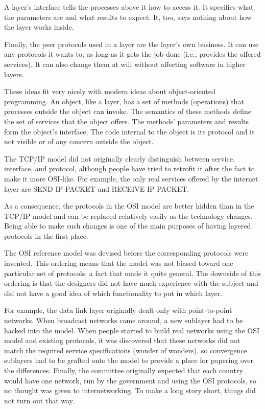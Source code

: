 \documentclass[b5paper,11pt]{memoir}
\begin{document}
A layer's {interface} tells the processes above it how to access it. It
specifies what the parameters are and what results to expect. It, too,
says nothing about how the layer works inside.

Finally, the peer {protocols} used in a layer are the layer's own
business. It can use any protocols it wants to, as long as it gets the
job done (i.e., provides the offered services). It can also change them
at will without affecting software in higher layers.

These ideas fit very nicely with modern ideas about object-oriented
programming. An object, like a layer, has a set of methods (operations)
that processes outside the object can invoke. The semantics of these
methods define the set of services that the object offers. The methods'
parameters and results form the object's interface. The code internal to
the object is its protocol and is not visible or of any concern outside
the object.

The TCP/IP model did not originally clearly distinguish between service,
interface, and protocol, although people have tried to retrofit it after
the fact to make it more OSI-like. For example, the only real services
offered by the internet layer are SEND IP PACKET and RECEIVE IP PACKET.

As a consequence, the protocols in the OSI model are better hidden than
in the TCP/IP model and can be replaced relatively easily as the
technology changes. Being able to make such changes is one of the main
purposes of having layered protocols in the first place.

The OSI reference model was devised {before} the corresponding protocols
were invented. This ordering means that the model was not biased toward
one particular set of protocols, a fact that made it quite general. The
downside of this ordering is that the designers did not have much
experience with the subject and did not have a good idea of which
functionality to put in which layer.

For example, the data link layer originally dealt only with
point-to-point networks. When broadcast networks came around, a new
sublayer had to be hacked into the model. When people started to build
real networks using the OSI model and existing protocols, it was
discovered that these networks did not match the required service
specifications (wonder of wonders), so convergence sublayers had to be
grafted onto the model to provide a place for papering over the
differences. Finally, the committee originally expected that each
country would have one network, run by the government and using the OSI
protocols, so no thought was given to internetworking. To make a long
story short, things did not turn out that way.
\end{document}
